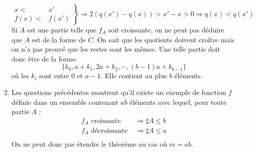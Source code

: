 \begin{enumerate}
\begin{enumerate}
\begin{displaymath}
 \left. 
\begin{aligned}
 x<&x'\\ f(x)<&f(x')
\end{aligned}
\right\rbrace 
\Rightarrow 2(q(x')-q(x)) > x'-x > 0 \Rightarrow q(x)<q(x')
\end{displaymath}
Si $A$ est une partie telle que $f_A$ soit croissante, on ne peut pas déduire que $A$ est de la forme de $C$. On sait que les quotients doivent croître mais on n'a pas prouvé que les restes sont les mêmes. Une telle partie doit donc être de la forme
\begin{displaymath}
 \{k_0, a+k_1, 2a+k_2,\cdots ,(b-1)a+k_{b-1}\}
\end{displaymath}
où les $k_i$ sont entre $0$ et $a-1$. Elle contient au plus $b$ éléments.
\item Les questions précédentes montrent qu'il existe un exemple de fonction $f$ définie dans un ensemble contenant $ab$ éléments avec lequel, pour toute partie $A$ : 
\begin{align*}
 f_A \text{ croissante } &\Rightarrow \sharp A \leq b \\
 f_A \text{ décroissante } &\Rightarrow \sharp A \leq a \\
\end{align*}
On ne peut donc pas étendre le théorème au cas où $m=ab$.
\end{enumerate}

\end{enumerate}
